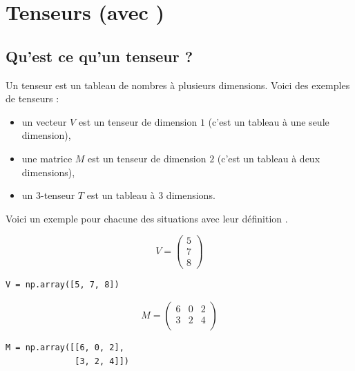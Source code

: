 \documentclass[11pt,class=report,crop=false]{standalone}
\begin{document}



\section{Tenseurs (avec \numpy)}


\subsection{Qu'est ce qu'un tenseur ?}

Un tenseur est un tableau de nombres à plusieurs dimensions.
Voici des exemples de tenseurs :
\begin{itemize}
  \item un vecteur $V$ est un tenseur de dimension $1$ (c'est un tableau à une seule dimension),
  \item une matrice $M$ est un tenseur de dimension $2$ (c'est un tableau à deux dimensions),
  \item un $3$-tenseur $T$ est un tableau à $3$ dimensions.
\end{itemize}

Voici un exemple pour chacune des situations avec leur définition \numpy.

\begin{minipage}{0.4\textwidth}
$$V = \begin{pmatrix}5\\7\\8\end{pmatrix}$$
\end{minipage}
\begin{minipage}{0.4\textwidth}
\begin{lstlisting}
V = np.array([5, 7, 8]) 
\end{lstlisting}
\end{minipage}

\medskip

\begin{minipage}{0.4\textwidth}
$$M = \begin{pmatrix}
6 & 0 & 2 \\ 
3 & 2 & 4 \\
\end{pmatrix}$$
\end{minipage}
\begin{minipage}{0.4\textwidth}
\begin{lstlisting}
M = np.array([[6, 0, 2], 
	          [3, 2, 4]])
\end{lstlisting}
\end{minipage}
\end{document}
